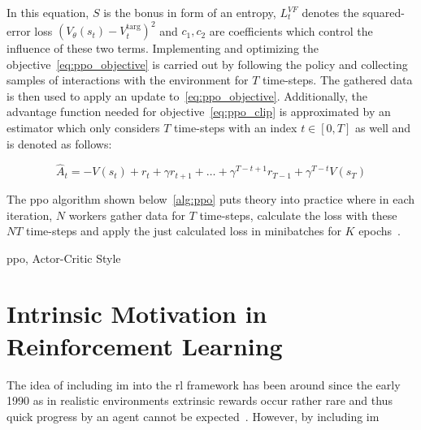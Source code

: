 \documentclass[draft,final]{vutinfth} %
\newcommand{\p}[1]{see p. #1}
\begin{document}
    In this equation, $S$ is the bonus in form of an entropy, $L_t^{VF}$ denotes the squared-error loss $(V_\theta(s_t)-V_t^{\text{targ}})^2$ and $c_1,c_2$ are coefficients which control the influence of these two terms.
    Implementing and optimizing the objective~\ref{eq:ppo_objective} is carried out by following the policy and collecting samples of interactions with the environment for $T$ time-steps.
    The gathered data is then used to apply an update to~\ref{eq:ppo_objective}.
    Additionally, the advantage function needed for objective~\ref{eq:ppo_clip} is approximated by an estimator which only considers $T$ time-steps with an index $t\in [0,T]$ as well and is denoted as follows:

    \begin{equation}
        \hat{A}_t=-V(s_t)+r_t+\gamma r_{t+1} + \dots + \gamma^{T-t+1}r_{T-1} + \gamma^{T-t}V(s_T)\label{eq:advantage_estimator}
    \end{equation}

    The \gls{ppo} algorithm shown below~\eqref{alg:ppo} puts theory into practice where in each iteration, $N$ workers gather data for $T$ time-steps, calculate the loss with these $NT$ time-steps and apply the just calculated loss in minibatches for $K$ epochs~\citep{francois-lavet_introduction_2018}.
    \newpage
    \begin{algorithm}
        \caption[\gls{ppo}, Actor-Critic Style]{\gls{ppo}, Actor-Critic Style\protect\footnotemark}
        \label{alg:ppo}




    \end{algorithm}

    \footnotetext{\citep[\p{5}]{schulman_proximal_2017}}

    \glsresetall


    \chapter{Intrinsic Motivation in Reinforcement Learning}
    The idea of including \gls{im} into the \gls{rl} framework has been around since the early 1990 as in realistic environments extrinsic rewards occur rather rare and thus quick progress by an agent cannot be expected~\citep{schmidhuber_formal_2010}.
    However, by including \gls{im}
\end{document}
